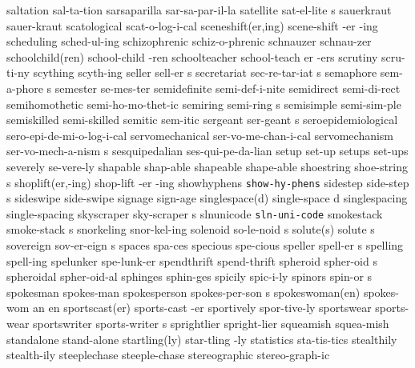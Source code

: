 \1 saltation		sal-ta-tion		%
\1 sarsaparilla		sar-sa-par-il-la
\5 satellite		sat-el-lite s		%
\1 sauerkraut		sauer-kraut
\1 scatological		scat-o-log-i-cal
\3 sceneshift(er,ing)	scene-shift -er -ing	%
\1 scheduling		sched-ul-ing
\1 schizophrenic	schiz-o-phrenic
\1 schnauzer		schnau-zer
\2 schoolchild(ren)	school-child -ren
\6 schoolteacher	school-teach er -ers
\1 scrutiny		scru-ti-ny		%
\1 scything		scyth-ing
\5 seller		sell-er s		%
\5 secretariat		sec-re-tar-iat s
\5 semaphore		sem-a-phore s
\1 semester		se-mes-ter
\1 semidefinite 	semi-def-i-nite
\1 semidirect		semi-di-rect		%
\1 semihomothetic	semi-ho-mo-thet-ic
\5 semiring		semi-ring s
\1 semisimple		semi-sim-ple		%
\1 semiskilled		semi-skilled
\1 semitic		sem-itic		%
\5 sergeant		ser-geant s		%
\1 seroepidemiological	sero-epi-de-mi-o-log-i-cal
\1 servomechanical	ser-vo-me-chan-i-cal	%
\5 servomechanism	ser-vo-mech-a-nism s
\1 sesquipedalian	ses-qui-pe-da-lian	%
\1 setup		set-up
\1 setups		set-ups
\1 severely		se-vere-ly
\1 shapable		shap-able		%
\1 shapeable		shape-able
\5 shoestring		shoe-string s
\3 shoplift(er,-ing)	shop-lift -er -ing	%
\1 showhyphens		{\tt\bs show-hy-phens}	%
\5 sidestep		side-step s
\1 sideswipe		side-swipe
\1 signage		sign-age		%
\2 singlespace(d)	single-space d		%
\1 singlespacing	single-spacing		%
\5 skyscraper		sky-scraper s
\1 slnunicode		{\tt sln-uni-code}	%
\5 smokestack		smoke-stack s
\1 snorkeling		snor-kel-ing
\5 solenoid		so-le-noid s
\2 solute(s)		solute s
\5 sovereign		sov-er-eign s
\1 spaces		spa-ces
\1 specious		spe-cious
\5 speller		spell-er s		%
\1 spelling		spell-ing		%
\1 spelunker		spe-lunk-er
\1 spendthrift		spend-thrift
\5 spheroid		spher-oid s
\1 spheroidal		spher-oid-al
\1 sphinges		sphin-ges
\1 spicily		spic-i-ly
\5 spinors		spin-or s
\1 spokesman		spokes-man		%
\5 spokesperson		spokes-per-son s	%
\3 spokeswoman(en)	spokes-wom an en
\2 sportscast(er)	sports-cast -er
\1 sportively		spor-tive-ly
\1 sportswear		sports-wear
\5 sportswriter		sports-writer s
\1 sprightlier		spright-lier
\1 squeamish		squea-mish
\1 standalone		stand-alone
\2 startling(ly)	star-tling -ly
\1 statistics		sta-tis-tics
\1 stealthily		stealth-ily
\1 steeplechase		steeple-chase
\1 stereographic	stereo-graph-ic		%
